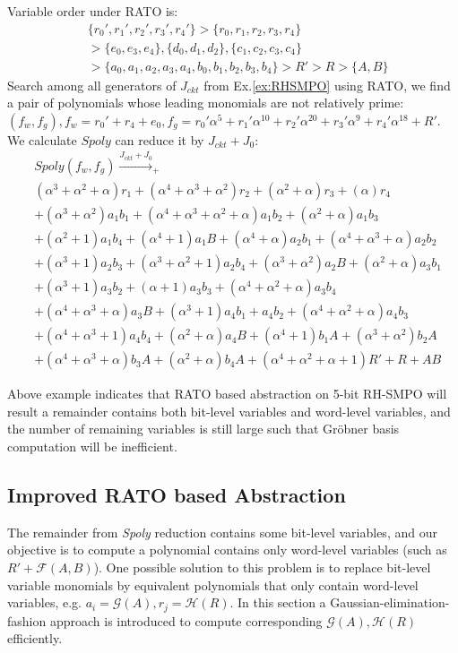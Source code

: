 \begin{Example}
\label{ex:newRATO}
Variable order under RATO is:
\begin{align}
&\{r_0',r_1',r_2',r_3',r_4'\}>\{r_0,r_1,r_2,r_3,r_4\}\nonumber\\
&>\{e_0,e_3,e_4\},\{d_0,d_1,d_2\},\{c_1,c_2,c_3,c_4\}\nonumber\\
&>\{a_0,a_1,a_2,a_3,a_4,b_0,b_1,b_2,b_3,b_4\}>R'>R>\{A,B\}\nonumber
\end{align}
Search among all generators of $J_{ckt}$ from Ex.\ref{ex:RHSMPO} using RATO, we find a pair of polynomials whose leading 
monomials are not relatively prime:
$(f_w,f_g), f_w = r_0'+r_4+e_0, f_g =r_0'\alpha^5+r_1'\alpha^{10}+r_2'\alpha^{20}+r_3'\alpha^9+r_4'\alpha^{18} + R'$.
We calculate $Spoly$ can reduce it by $J_{ckt}+J_0$:
\begin{align}
&Spoly(f_w,f_g) \xrightarrow{J_{ckt}+J_0}_{+}\nonumber\\
&(\alpha^3+\alpha^2+\alpha) r_1+(\alpha^4+\alpha^3+\alpha^2) r_2+(\alpha^2+\alpha) r_3+(\alpha) r_4\nonumber\\
&+(\alpha^3+\alpha^2) a_1 b_1+(\alpha^4+\alpha^3+\alpha^2+\alpha) a_1 b_2+(\alpha^2+\alpha) a_1 b_3\nonumber\\
&+(\alpha^2+1) a_1 b_4+(\alpha^4+1) a_1 B+(\alpha^4+\alpha) a_2 b_1+(\alpha^4+\alpha^3+\alpha) a_2 b_2\nonumber\\
&+(\alpha^3+1) a_2 b_3+(\alpha^3+\alpha^2+1) a_2 b_4+(\alpha^3+\alpha^2) a_2 B+(\alpha^2+\alpha) a_3 b_1\nonumber\\
&+(\alpha^3+1) a_3 b_2+(\alpha+1) a_3 b_3+(\alpha^4+\alpha^2+\alpha) a_3 b_4\nonumber\\
&+(\alpha^4+\alpha^3+\alpha) a_3 B+(\alpha^3+1) a_4 b_1+a_4 b_2+(\alpha^4+\alpha^2+\alpha) a_4 b_3\nonumber\\
&+(\alpha^4+\alpha^3+1) a_4 b_4+(\alpha^2+\alpha) a_4 B+(\alpha^4+1) b_1 A+(\alpha^3+\alpha^2) b_2 A\nonumber\\
&+(\alpha^4+\alpha^3+\alpha) b_3 A+(\alpha^2+\alpha) b_4 A+(\alpha^4+\alpha^2+\alpha+1) R'+R+A B\nonumber
\end{align}
\end{Example}
Above example indicates that RATO based abstraction on 5-bit RH-SMPO will result a remainder contains both
bit-level variables and word-level variables, and the number of remaining variables is still large such that
Gr\"obner basis computation will be inefficient.

\subsection{Improved RATO based Abstraction}
The remainder from \emph{Spoly} reduction contains some bit-level variables, and our objective is to compute
a polynomial contains only word-level variables (such as $R'+\mathcal{F}(A,B)$). One possible solution to
this problem is to replace bit-level variable monomials by equivalent polynomials that only contain word-level
variables, e.g. $a_i = \mathcal{G}(A), r_j = \mathcal{H}(R)$. In this section a Gaussian-elimination-fashion 
approach is introduced to compute corresponding $\mathcal{G}(A),\mathcal{H}(R)$ efficiently.

